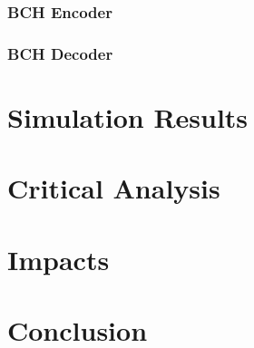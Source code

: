 \documentclass[pdftex,11pt,a4paper]{article}
\begin{document}
\subsubsection{BCH Encoder}

\subsubsection{BCH Decoder}

\section{Simulation Results}
\section{Critical Analysis}

\section{Impacts}

\section{Conclusion}
\newpage


\end{document}
